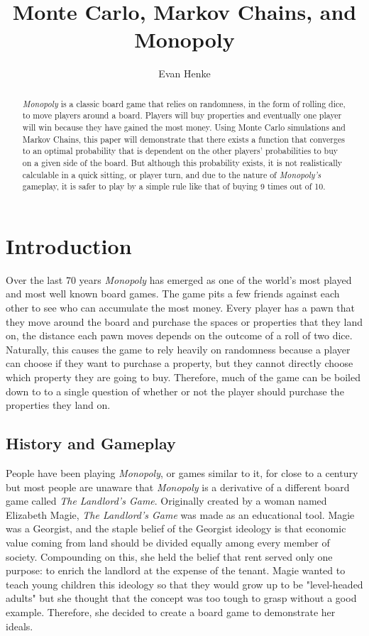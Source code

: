 \documentclass{article}
\begin{document}
\title{Monte Carlo, Markov Chains, and Monopoly}
\author{Evan Henke}

\maketitle

\begin{abstract}
\textit{Monopoly} is a classic board game that relies on randomness, in the form of rolling dice, to move players around a board.  Players will buy properties and eventually one player will win because they have gained the most money.  Using Monte Carlo simulations and Markov Chains, this paper will demonstrate that there exists a function that converges to an optimal probability that is dependent on the other players' probabilities to buy on a given side of the board.  But although this probability exists, it is not realistically calculable in a quick sitting, or player turn, and due to the nature of \textit{Monopoly's} gameplay, it is safer to play by a simple rule like that of buying 9 times out of 10.
\end{abstract}


\section{Introduction}

Over the last 70 years \textit{Monopoly} has emerged as one of the world’s most played and most well known board games.  The game pits a few friends against each other to see who can accumulate the most money.  Every player has a pawn that they move around the board and purchase the spaces or properties that they land on, the distance each pawn moves depends on the outcome of a roll of two dice.  Naturally, this causes the game to rely heavily on randomness because a player can choose if they want to purchase a property, but they cannot directly choose which property they are going to buy. Therefore, much of the game can be boiled down to to a single question of whether or not the player should purchase the properties they land on.

\subsection{History and Gameplay}

People have been playing \textit{Monopoly}, or games similar to it, for close to a century but most people are unaware that \textit{Monopoly} is a derivative of a different board game called \textit{The Landlord’s Game}.  Originally created by a woman named Elizabeth Magie, \textit{The Landlord’s Game} was made as an educational tool.  Magie was a Georgist, and the staple belief of the Georgist ideology is that economic value coming from land should be divided equally among every member of society.  Compounding on this, she held the belief that rent served only one purpose: to enrich the landlord at the expense of the tenant.  Magie wanted to teach young children this ideology so that they would grow up to be "level-headed adults" but she thought that the concept was too tough to grasp without a good example. Therefore, she decided to create a board game to demonstrate her ideals.\cite{monopolyhistory}
\end{document}

